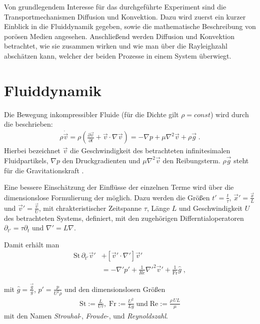 \label{cha:theo}

Von grundlegendem Interesse für das durchgeführte Experiment sind die Transportmechanismen Diffusion und Konvektion. Dazu wird zuerst ein kurzer Einblick in die Fluiddynamik gegeben, sowie die mathematische Beschreibung von porösen Medien angesehen. Anschließend werden Diffusion und Konvektion betrachtet, wie sie zusammen wirken und wie man über die Rayleighzahl abschätzen kann, welcher der beiden Prozesse in einem System überwiegt.


\section{Fluiddynamik}
\label{sec:hyd}
Die Bewegung inkompressibler Fluide (\dah für die Dichte gilt $\rho = const$) wird durch die \NSG beschrieben:
\begin{eqnarray}
 \rho \dot{\vec{v}} = \rho \left( \frac{\partial \vec{v}}{\partial t} + \vec{v} \cdot \nabla \vec{v} \right) = - \nabla p + \mu \nabla^2 \vec{v} + \rho\vec{g} \; .
\end{eqnarray}
Hierbei bezeichnet $\vec{v}$ die Geschwindigkeit des betrachteten infinitesimalen Fluidpartikels, $\nabla p$ den Druckgradienten und $\mu \nabla^2 \vec{v}$ den Reibungsterm. $\rho\vec{g}$ steht für die Gravitationskraft \citep{roth2005}.

Eine bessere Einschätzung der Einflüsse der einzelnen Terme wird über die dimensionslose Formulierung der \NSG möglich. Dazu werden die Größen $t' = \frac{t}{\tau}$,  $\vec{x}' = \frac{\vec{x}}{L}$ und $\vec{v}' = \frac{\vec{v}}{U}$, mit chrakteristischer Zeitspanne $\tau$, Länge $L$ und Geschwindigkeit $U$ des betrachteten Systems, definiert, mit den zugehörigen Differntialoperatoren $\partial_{t'} = \tau\partial_t$ und $\nabla' = L\nabla$. 

Damit erhält man
\begin{equation}
\begin{aligned}
 \mathrm{St} \, \partial_{t'} \vec{v}' &+ \left[\vec{v}' \cdot \nabla' \right]\vec{v}' \\
 &= -\nabla'p' + \frac{1}{Re}\nabla'^2\vec{v}' + \frac{1}{\mathrm{Fr}}\hat{g} \; ,
\end{aligned}
\end{equation}

mit $\hat{g} = \frac{\vec{g}}{g}$, $p' = \frac{p}{U^2\rho}$ und den dimensionslosen Größen 
\begin{align}
 \mathrm{St} := \frac{L}{U\tau}, \; \mathrm{Fr} := \frac{U^2}{Lg} \; \mathrm{und}  \; \mathrm{Re} := \frac{\rho \, U L}{\mu}
 \label{eq:Re}
\end{align}
 mit den Namen \textit{Strouhal}-, \textit{Froude}-, und \textit{Reynoldszahl}.


